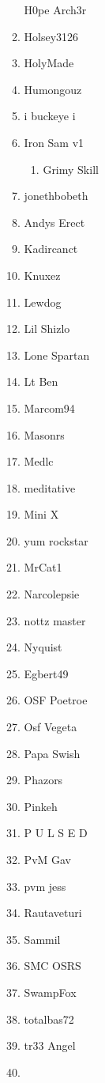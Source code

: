 \documentclass{article}
\begin{document}
\begin{enumerate}[I]
\begin{enumerate}[I]
	H0pe Arch3r
      \item
	Holsey3126
      \item
	HolyMade
      \item
	Humongouz
      \item
	i buckeye i
      \item
	Iron Sam v1
	  \begin{enumerate}[I]
	    \item
	      Grimy Skill
	  \end{enumerate}
      \item
	jonethbobeth
      \item
	Andys Erect
      \item
	Kadircanct
      \item
	Knuxez
      \item
	Lewdog
      \item
	Lil Shizlo
      \item
	Lone Spartan
      \item
	Lt Ben
      \item
	Marcom94
      \item
	Masonrs
      \item
	Medlc
      \item
	meditative
      \item
	Mini X
      \item
	yum rockstar
      \item
	MrCat1
      \item
	Narcolepsie
      \item
	nottz master
      \item
	Nyquist
      \item
	Egbert49
      \item
	OSF Poetroe
      \item
	Osf Vegeta
      \item
	Papa Swish
      \item
	Phazors
      \item
	Pinkeh
      \item
	P U L S E D
      \item
	PvM Gav
      \item
	pvm jess
      \item
	Rautaveturi
      \item
	Sammil
      \item
	SMC OSRS
      \item
	SwampFox
      \item
	totalbas72
      \item
	tr33 Angel
      \item

\end{enumerate}
\end{enumerate}
\end{document}
